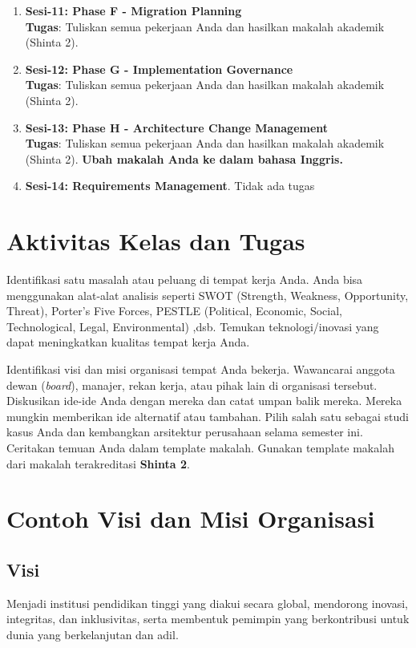 \begin{enumerate}
	\item \textbf{Sesi-11: Phase F - Migration Planning} \\
	\textbf{Tugas}: Tuliskan semua pekerjaan Anda dan hasilkan makalah akademik (Shinta 2).
	
	\item \textbf{Sesi-12: Phase G - Implementation Governance} \\
	\textbf{Tugas}: Tuliskan semua pekerjaan Anda dan hasilkan makalah akademik (Shinta 2).
	
	\item \textbf{Sesi-13: Phase H - Architecture Change Management} \\
	\textbf{Tugas}: Tuliskan semua pekerjaan Anda dan hasilkan makalah akademik (Shinta 2). \textbf{Ubah makalah Anda ke dalam bahasa Inggris.}
	
	\item \textbf{Sesi-14: Requirements Management}. Tidak ada tugas
\end{enumerate}


\section{Aktivitas Kelas dan Tugas}
Identifikasi satu masalah atau peluang di tempat kerja Anda. Anda bisa menggunakan alat-alat analisis seperti SWOT (Strength, Weakness, Opportunity, Threat), Porter's Five Forces, PESTLE (Political, Economic, Social, Technological, Legal, Environmental) ,dsb. Temukan teknologi/inovasi yang dapat meningkatkan kualitas tempat kerja Anda.

Identifikasi visi dan misi organisasi tempat Anda bekerja. Wawancarai anggota dewan (\textit{board}), manajer, rekan kerja, atau pihak lain di organisasi tersebut. Diskusikan ide-ide Anda dengan mereka dan catat umpan balik mereka. Mereka mungkin memberikan ide alternatif atau tambahan. Pilih salah satu sebagai studi kasus Anda dan kembangkan arsitektur perusahaan selama semester ini. Ceritakan temuan Anda dalam template makalah. Gunakan template makalah dari makalah terakreditasi \textbf{Shinta 2}.


\section{Contoh Visi dan Misi Organisasi}

\subsection{Visi}
Menjadi institusi pendidikan tinggi yang diakui secara global, mendorong inovasi, integritas, dan inklusivitas, serta membentuk pemimpin yang berkontribusi untuk dunia yang berkelanjutan dan adil.

